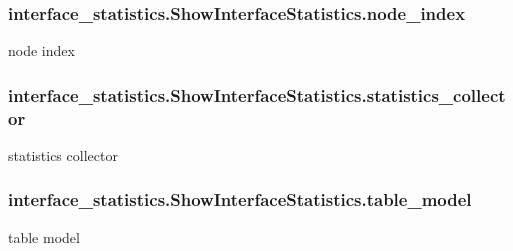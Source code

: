 \subsubsection[{\texorpdfstring{node\+\_\+index}{node_index}}]{\setlength{\rightskip}{0pt plus 5cm}interface\+\_\+statistics.\+Show\+Interface\+Statistics.\+node\+\_\+index}\hypertarget{classinterface__statistics_1_1ShowInterfaceStatistics_abbc97003c4c6ed1b21f6825e6a6e46f7}{}\label{classinterface__statistics_1_1ShowInterfaceStatistics_abbc97003c4c6ed1b21f6825e6a6e46f7}


node index 

\subsubsection[{\texorpdfstring{statistics\+\_\+collector}{statistics_collector}}]{\setlength{\rightskip}{0pt plus 5cm}interface\+\_\+statistics.\+Show\+Interface\+Statistics.\+statistics\+\_\+collector}\hypertarget{classinterface__statistics_1_1ShowInterfaceStatistics_aec46892f4f5176428b1a216794387e56}{}\label{classinterface__statistics_1_1ShowInterfaceStatistics_aec46892f4f5176428b1a216794387e56}


statistics collector 

\subsubsection[{\texorpdfstring{table\+\_\+model}{table_model}}]{\setlength{\rightskip}{0pt plus 5cm}interface\+\_\+statistics.\+Show\+Interface\+Statistics.\+table\+\_\+model}\hypertarget{classinterface__statistics_1_1ShowInterfaceStatistics_acd0afcf7ebcf7e64428196ef5526fbe6}{}\label{classinterface__statistics_1_1ShowInterfaceStatistics_acd0afcf7ebcf7e64428196ef5526fbe6}


table model 

